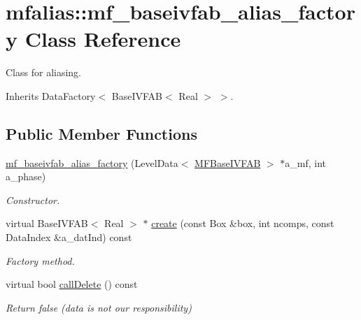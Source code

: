 \hypertarget{classmfalias_1_1mf__baseivfab__alias__factory}{}\section{mfalias\+:\+:mf\+\_\+baseivfab\+\_\+alias\+\_\+factory Class Reference}
\label{classmfalias_1_1mf__baseivfab__alias__factory}


Class for aliasing.  




Inherits Data\+Factory$<$ Base\+I\+V\+F\+A\+B$<$ Real $>$ $>$.

\subsection*{Public Member Functions}
\begin{DoxyCompactItemize}
\item 
\hyperlink{classmfalias_1_1mf__baseivfab__alias__factory_af58715a875608ffc382443ed6502f119}{mf\+\_\+baseivfab\+\_\+alias\+\_\+factory} (Level\+Data$<$ \hyperlink{classMFBaseIVFAB}{M\+F\+Base\+I\+V\+F\+AB} $>$ $\ast$a\+\_\+mf, int a\+\_\+phase)
\begin{DoxyCompactList}\small\item\em Constructor. \end{DoxyCompactList}\item 
virtual Base\+I\+V\+F\+AB$<$ Real $>$ $\ast$ \hyperlink{classmfalias_1_1mf__baseivfab__alias__factory_a22b98edfb6195c0cddbce8f361c18eed}{create} (const Box \&box, int ncomps, const Data\+Index \&a\+\_\+dat\+Ind) const 
\begin{DoxyCompactList}\small\item\em Factory method. \end{DoxyCompactList}\item 
virtual bool \hyperlink{classmfalias_1_1mf__baseivfab__alias__factory_ada5d251e4f079655bb50849c97a1d942}{call\+Delete} () const 
\begin{DoxyCompactList}\small\item\em Return false (data is not our responsibility) \end{DoxyCompactList}\end{DoxyCompactItemize}

